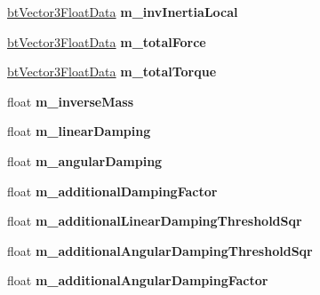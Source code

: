 \begin{DoxyCompactItemize}
\item 
\mbox{\label{structbtRigidBodyFloatData_a70d3994ba3bd1c309231645c657f99d2}} 
\hyperlink{structbtVector3FloatData}{bt\+Vector3\+Float\+Data} {\bfseries m\+\_\+inv\+Inertia\+Local}
\item 
\mbox{\label{structbtRigidBodyFloatData_a52b68d81e9a94d40b49a2ebd6fd8e9e2}} 
\hyperlink{structbtVector3FloatData}{bt\+Vector3\+Float\+Data} {\bfseries m\+\_\+total\+Force}
\item 
\mbox{\label{structbtRigidBodyFloatData_a405857f125beda9bcbe3d77481bcdd6c}} 
\hyperlink{structbtVector3FloatData}{bt\+Vector3\+Float\+Data} {\bfseries m\+\_\+total\+Torque}
\item 
\mbox{\label{structbtRigidBodyFloatData_ae08730abd56750461bb88aac3c064568}} 
float {\bfseries m\+\_\+inverse\+Mass}
\item 
\mbox{\label{structbtRigidBodyFloatData_a22781217674076f42f70368097dde3a2}} 
float {\bfseries m\+\_\+linear\+Damping}
\item 
\mbox{\label{structbtRigidBodyFloatData_aecb3ccda7232a1e2628125b3e191b8ff}} 
float {\bfseries m\+\_\+angular\+Damping}
\item 
\mbox{\label{structbtRigidBodyFloatData_ad7ca6e8eec406b80b5338a02c6957c81}} 
float {\bfseries m\+\_\+additional\+Damping\+Factor}
\item 
\mbox{\label{structbtRigidBodyFloatData_a7cfb604e6d732e652f2e3cc20bb6750a}} 
float {\bfseries m\+\_\+additional\+Linear\+Damping\+Threshold\+Sqr}
\item 
\mbox{\label{structbtRigidBodyFloatData_afdcfc3b4015f10ca38d194833d8c887a}} 
float {\bfseries m\+\_\+additional\+Angular\+Damping\+Threshold\+Sqr}
\item 
\mbox{\label{structbtRigidBodyFloatData_a8964f30a5e6fe9692e49eebb59eb32ee}} 
float {\bfseries m\+\_\+additional\+Angular\+Damping\+Factor}

\end{DoxyCompactItemize}
